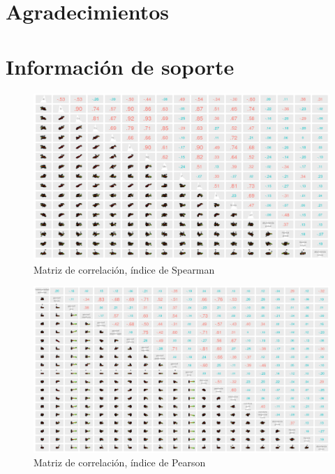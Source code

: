 \documentclass[11pt,]{article}
\newcommand{\beginsupplement}{ \setcounter{table}{0} \renewcommand{\thetable}{S\arabic{table}} \setcounter{figure}{0} \renewcommand{\thefigure}{S\arabic{figure}} }
\begin{document}
\section{Agradecimientos}\label{agradecimientos}

\section{Información de soporte}\label{informaciuxf3n-de-soporte}

\beginsupplement

\begin{figure}
\centering
\includegraphics{matriz_correlacion_suelo_abun_riq_spearman.png}
\caption{Matriz de correlación, índice de Spearman
\label{fig:matriz_spearman}}
\end{figure}

\begin{figure}
\centering
\includegraphics{matriz_correlacion_geomorf_abun_riq_spearman.png}
\caption{Matriz de correlación, índice de Pearson
\label{fig:matriz_pearson}}
\end{figure}
\end{document}
